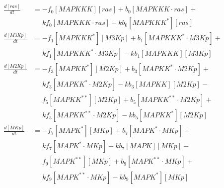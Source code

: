 \begin{equation*}
  \begin{align*}
    \frac{d[ras]}{dt} &= -f_{0}[MAPKKK][ras] + b_{0}[MAPKKK\cdot{}ras] +\\
    &\phantom{=} kf_{0}[MAPKKK\cdot{}ras] - kb_{0}[MAPKKK^{*}][ras]\\
    \frac{d[M3Kp]}{dt} &= -f_{1}[MAPKKK^{*}][M3Kp] + b_{1}[MAPKKK^{*}\cdot{}M3Kp] +\\
    &\phantom{=} kf_{1}[MAPKKK^{*}\cdot{}M3Kp] - kb_{1}[MAPKKK][M3Kp]\\
    \frac{d[M2Kp]}{dt} &= -f_{3}[MAPKK^{*}][M2Kp] + b_{3}[MAPKK^{*}\cdot{}M2Kp] +\\
    &\phantom{=} kf_{3}[MAPKK^{*}\cdot{}M2Kp] - kb_{3}[MAPKK][M2Kp] -\\
    &\phantom{=} f_{5}[MAPKK^{**}][M2Kp] + b_{5}[MAPKK^{**}\cdot{}M2Kp] +\\
    &\phantom{=} kf_{5}[MAPKK^{**}\cdot{}M2Kp] - kb_{5}[MAPKK^{*}][M2Kp]\\
    \frac{d[MKp]}{dt} &= -f_{7}[MAPK^{*}][MKp] + b_{7}[MAPK^{*}\cdot{}MKp] +\\
    &\phantom{=} kf_{7}[MAPK^{*}\cdot{}MKp] - kb_{7}[MAPK][MKp] -\\
    &\phantom{=} f_{9}[MAPK^{**}][MKp] + b_{9}[MAPK^{**}\cdot{}MKp] +\\
    &\phantom{=} kf_{9}[MAPK^{**}\cdot{}MKp] - kb_{9}[MAPK^{*}][MKp]\\
  \end{align*}
\end{equation*}
\normalsize

